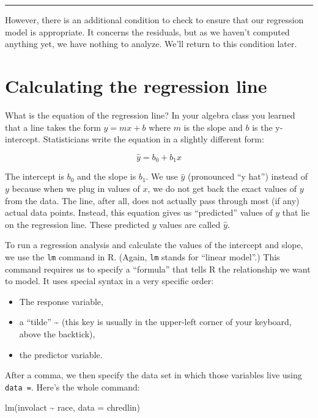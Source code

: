 \documentclass[
]{book}
\newenvironment{Shaded}{\begin{snugshade}}{\end{snugshade}}
\newcommand{\AttributeTok}[1]{\textcolor[rgb]{0.77,0.63,0.00}{#1}}
\newcommand{\FunctionTok}[1]{\textcolor[rgb]{0.00,0.00,0.00}{#1}}
\newcommand{\NormalTok}[1]{#1}
\newcommand{\SpecialCharTok}[1]{\textcolor[rgb]{0.00,0.00,0.00}{#1}}
\providecommand{\tightlist}{%
  \setlength{\itemsep}{0pt}\setlength{\parskip}{0pt}}
\begin{document}
\begin{center}\rule{0.5\linewidth}{0.5pt}\end{center}

However, there is an additional condition to check to ensure that our regression model is appropriate. It concerns the residuals, but as we haven't computed anything yet, we have nothing to analyze. We'll return to this condition later.

\hypertarget{regression-calculating}{%
\section{Calculating the regression line}\label{regression-calculating}}

What is the equation of the regression line? In your algebra class you learned that a line takes the form \(y = mx + b\) where \(m\) is the slope and \(b\) is the y-intercept. Statisticians write the equation in a slightly different form:

\[
\hat{y} = b_{0} + b_{1} x
\]

The intercept is \(b_{0}\) and the slope is \(b_{1}\). We use \(\hat{y}\) (pronounced ``y hat'') instead of \(y\) because when we plug in values of \(x\), we do not get back the exact values of \(y\) from the data. The line, after all, does not actually pass through most (if any) actual data points. Instead, this equation gives us ``predicted'' values of \(y\) that lie on the regression line. These predicted \(y\) values are called \(\hat{y}\).

To run a regression analysis and calculate the values of the intercept and slope, we use the \texttt{lm} command in R. (Again, \texttt{lm} stands for ``linear model''.) This command requires us to specify a ``formula'' that tells R the relationship we want to model. It uses special syntax in a very specific order:

\begin{itemize}
\tightlist
\item
  The response variable,
\item
  a ``tilde'' \textasciitilde{} (this key is usually in the upper-left corner of your keyboard, above the backtick),
\item
  the predictor variable.
\end{itemize}

After a comma, we then specify the data set in which those variables live using \texttt{data\ =}. Here's the whole command:

\begin{Shaded}
\begin{Highlighting}[]
\FunctionTok{lm}\NormalTok{(involact }\SpecialCharTok{\textasciitilde{}}\NormalTok{ race, }\AttributeTok{data =}\NormalTok{ chredlin)}
\end{Highlighting}
\end{Shaded}
\end{document}
